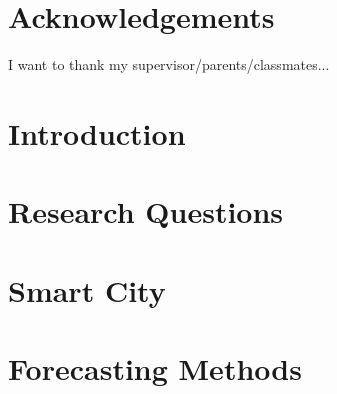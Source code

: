 \documentclass[12pt]{report}
\begin{document}




\doublespacing
\tableofcontents
\singlespacing

\thispagestyle{plain}
\clearpage

\listoffigures

\clearpage

\listoftables

\renewcommand{\glsnamefont}[1]{\textbf{#1}}
\renewcommand*{\arraystretch}{1.3}
\printnoidxglossary[type=\acronymtype, sort = letter, title = List of Acronyms, nonumberlist, style = long]

\clearpage



\chapter*{Acknowledgements}
I want to thank my supervisor/parents/classmates...

\chapter{Introduction}


\chapter{Research Questions}

 
\chapter{Smart City}

 
\chapter{Forecasting Methods}

\end{document}
